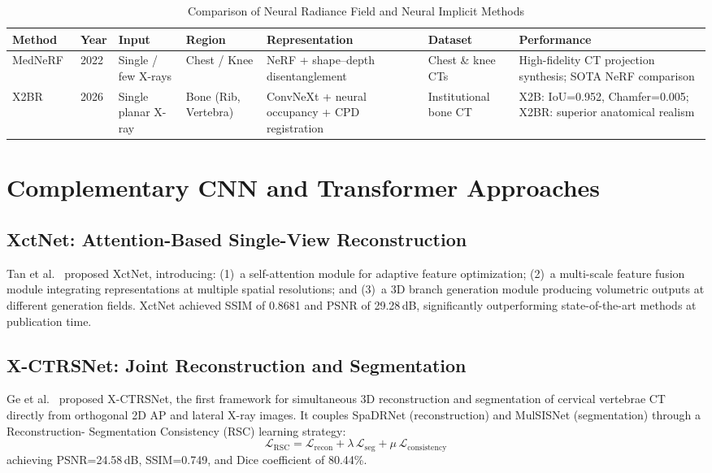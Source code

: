\documentclass[10pt,twocolumn,a4paper]{article}
\begin{document}
\begin{table}[t]
\caption{Comparison of Neural Radiance Field and Neural Implicit Methods}
\label{tab:nerf_comparison}
\centering\small
\setlength{\tabcolsep}{4pt}
\begin{tabular}{@{}llllp{2.5cm}p{2.0cm}p{3.2cm}@{}}
\toprule
\textbf{Method} & \textbf{Year} & \textbf{Input} & \textbf{Region} &
\textbf{Representation} & \textbf{Dataset} & \textbf{Performance}\\
\midrule
MedNeRF~\cite{mednerf} & 2022 & Single / few X-rays & Chest / Knee &
  NeRF + shape--depth disentanglement & Chest \& knee CTs &
  High-fidelity CT projection synthesis; SOTA NeRF comparison\\
X2BR~\cite{x2br} & 2026 & Single planar X-ray & Bone (Rib, Vertebra) &
  ConvNeXt + neural occupancy + CPD registration & Institutional bone CT &
  X2B: IoU=0.952, Chamfer=0.005; X2BR: superior anatomical realism\\
\bottomrule
\end{tabular}
\end{table}

\section{Complementary CNN and Transformer Approaches}
\label{sec:cnn}

\subsection{XctNet: Attention-Based Single-View Reconstruction}
\label{sec:cnn:xctnet}

Tan et al.~\cite{xctnet} proposed XctNet, introducing: (1)~a self-attention
module for adaptive feature optimization; (2)~a multi-scale feature fusion
module integrating representations at multiple spatial resolutions; and
(3)~a 3D branch generation module producing volumetric outputs at different
generation fields. XctNet achieved SSIM of 0.8681 and PSNR of 29.28\,dB,
significantly outperforming state-of-the-art methods at publication time.

\subsection{X-CTRSNet: Joint Reconstruction and Segmentation}
\label{sec:cnn:xctrs}

Ge et al.~\cite{xctrsnet} proposed X-CTRSNet, the first framework for
simultaneous 3D reconstruction and segmentation of cervical vertebrae CT
directly from orthogonal 2D AP and lateral X-ray images. It couples SpaDRNet
(reconstruction) and MulSISNet (segmentation) through a Reconstruction-
Segmentation Consistency (RSC) learning strategy:
\begin{equation}
\mathcal{L}_\text{RSC} = \mathcal{L}_\text{recon}
+ \lambda\,\mathcal{L}_\text{seg}
+ \mu\,\mathcal{L}_\text{consistency}
\label{eq:rsc}
\end{equation}
achieving PSNR=24.58\,dB, SSIM=0.749, and Dice coefficient of 80.44\%.
\end{document}
